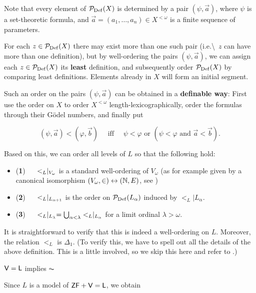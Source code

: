 Note that every element of $\mathcal{P}_{\operatorname{Def}}(X)$ is determined by a pair $(\psi, \vec{a})$, where $\psi$ is a set-theoretic formula, and $\vec{a} = (a_1, \dots, a_n) \in X^{<\omega}$ is a finite sequence of parameters.

For each $z \in \mathcal{P}_{\operatorname{Def}}(X)$ there may exist more than one such pair (i.e.{\textbackslash}~$z$ can have more than one definition), but by well-ordering the pairs $(\psi, \vec{a})$, we can assign each $z \in \mathcal{P}_{\operatorname{Def}}(X)$ its \textbf{least} definition, and subsequently order $\mathcal{P}_{\operatorname{Def}}(X)$ by comparing least definitions. Elements already in $X$ will form an initial segment.

Such an order on the pairs $(\psi, \vec{a})$ can be obtained in a \textbf{definable way}: First use the order on $X$ to order $X^{<\omega}$ length-lexicographically, order the formulas through their Gödel numbers, and finally put

\begin{equation}
(\psi,\vec{a}) < (\varphi, \vec{b}) \quad \text{ iff } \quad \psi < \varphi \text { or } (\psi < \varphi \text { and } \vec{a} < \vec{b}).
\end{equation}

Based on this, we can order all levels of $L$ so that the following hold:

\begin{itemize}
\item (\textbf{1}) $\quad$   $<_L \mid_{V_\omega}$ is a standard well-ordering of $V_\omega$   (as for example given by a canonical isomorphism $(V_\omega, \in) \leftrightarrow (\mathbb{N}, E)$, see \cite{Ackermann:1937a})
\item (\textbf{2}) $\quad$   $<_L\mid_{L_{\alpha+1}}$ is the order on $\mathcal{P}_{\operatorname{Def}}(L_\alpha)$ induced by $<_L|L_\alpha$.
\item (\textbf{3}) $\quad$   $<_L\mid_{L_\lambda} = \bigcup_{\alpha < \lambda} <_L \mid_{L_\alpha}$ for a limit ordinal $\lambda > \omega$.
\end{itemize}

It is straightforward to verify that this is indeed a well-ordering on $L$. Moreover, the relation $<_L$ is $\Delta_1$. (To verify this, we have to spell out all the details of the above definition. This is a little involved, so we skip this here and refer to \cite{jech2003a}.)

\begin{theorem}\label{thm-l-ac}$\mathsf{V=L}$ implies $\AC$

\end{theorem}Since $L$ is a model of $\mathsf{ZF}+\mathsf{V=L}$, we obtain

